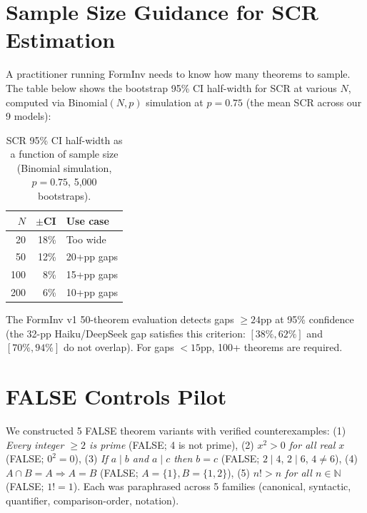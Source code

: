 \documentclass{article}
\begin{document}
\section{Sample Size Guidance for SCR Estimation}
\label{app:sample_size}

A practitioner running FormInv needs to know how many theorems to sample.
The table below shows the bootstrap 95\% CI half-width for SCR at various $N$,
computed via Binomial$(N, p)$ simulation at $p = 0.75$ (the mean SCR across our 9 models):

\begin{table}[h]\centering\small
\caption{SCR 95\% CI half-width as a function of sample size (Binomial simulation, $p=0.75$, 5,000 bootstraps).}
\label{tab:sample_size}
\begin{tabular}{rrp{3.0cm}}
\toprule
$N$ & $\pm$CI & Use case \\
\midrule
20 & 18\% & Too wide \\
50 & 12\% & 20+pp gaps \\
100 & 8\% & 15+pp gaps \\
200 & 6\% & 10+pp gaps \\
\bottomrule
\end{tabular}
\end{table}

The FormInv v1 50-theorem evaluation detects gaps $\geq 24$pp at 95\% confidence
(the 32-pp Haiku/DeepSeek gap satisfies this criterion: $[38\%,62\%]$ and $[70\%,94\%]$ do not overlap).
For gaps $<15$pp, 100+ theorems are required.

\section{FALSE Controls Pilot}
\label{app:false_controls}

We constructed 5 FALSE theorem variants with verified counterexamples:
(1) \emph{Every integer $\geq 2$ is prime} (FALSE; 4 is not prime),
(2) \emph{$x^2 > 0$ for all real $x$} (FALSE; $0^2=0$),
(3) \emph{If $a{\mid}b$ and $a{\mid}c$ then $b=c$} (FALSE; $2{\mid}4$, $2{\mid}6$, $4{\neq}6$),
(4) \emph{$A{\cap}B=A \Rightarrow A=B$} (FALSE; $A=\{1\},B=\{1,2\}$),
(5) \emph{$n! > n$ for all $n \in \mathbb{N}$} (FALSE; $1!=1$).
Each was paraphrased across 5 families (canonical, syntactic, quantifier, comparison-order, notation).
\end{document}
